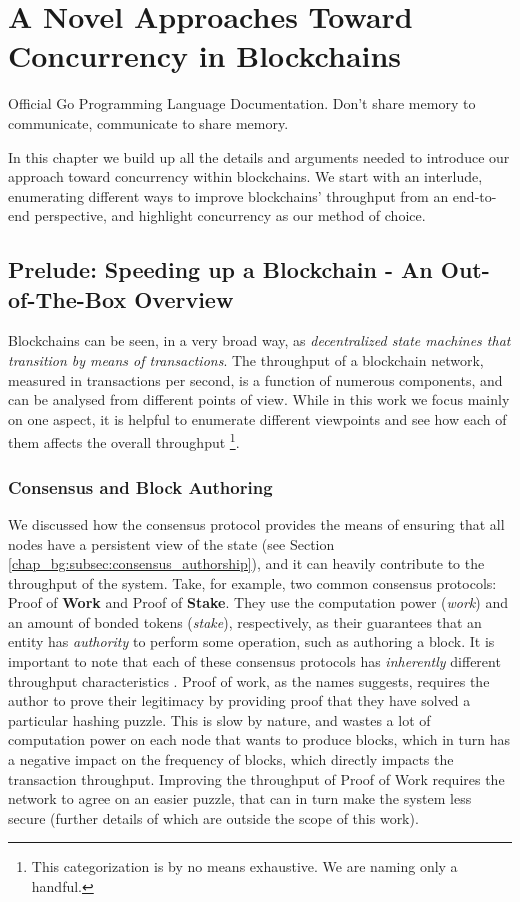 \chapter{A Novel Approaches Toward Concurrency in Blockchains} \label{chap:approach}

\begin{chapquote}{Official Go Programming Language Documentation.}
	Don't share memory to communicate, communicate to share memory.
\end{chapquote}

In this chapter we build up all the details and arguments needed to introduce our approach toward
concurrency within blockchains. We start with an interlude, enumerating different ways to improve
blockchains' throughput from an end-to-end perspective, and highlight concurrency as our method of
choice.

\section{Prelude: Speeding up a Blockchain - An Out-of-The-Box Overview}
\label{chap_approach:sec:ways_to_speedup}

Blockchains can be seen, in a very broad way, as \textit{decentralized state machines that
transition by means of transactions}. The throughput of a blockchain network, measured in
transactions per second, is a function of numerous components, and can be analysed from different
points of view. While in this work we focus mainly on one aspect, it is helpful to enumerate
different viewpoints and see how each of them affects the overall throughput \footnote{This
categorization is by no means exhaustive. We are naming only a handful.}.

\subsection{Consensus and Block Authoring}
We discussed how the consensus protocol provides the means of ensuring that all nodes have a
persistent view of the state (see Section \ref{chap_bg:subsec:consensus_authorship}), and it can
heavily contribute to the throughput of the system. Take, for example, two common consensus
protocols: Proof of \textbf{Work} and Proof of \textbf{Stake}. They use the computation power
(\textit{work}) and an amount of bonded tokens (\textit{stake}), respectively, as their guarantees
that an entity has \textit{authority} to perform some operation, such as authoring a block. It is
important to note that each of these consensus protocols has \textit{inherently} different
throughput characteristics \cite{meneghettiSurveyEfficientParallelization2019}. Proof of work, as
the names suggests, requires the author to prove their legitimacy by providing proof that they have
solved a particular hashing puzzle. This is slow by nature, and wastes a lot of computation power on
each node that wants to produce blocks, which in turn has a negative impact on the frequency of
blocks, which directly impacts the transaction throughput. Improving the throughput of Proof of Work
requires the network to agree on an easier puzzle, that can in turn make the system less secure
\cite{gervaisSecurityPerformanceProof2016} (further details of which are outside the scope of this
work).

